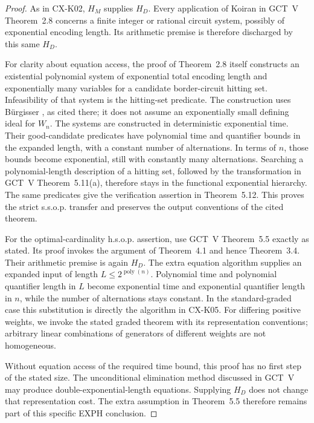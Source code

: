 \documentclass[11pt,a4paper]{article}
\begin{document}
\begin{proof}
As in CX-K02, $H_M$ supplies $H_D$. Every application of Koiran in
GCT~V Theorem~2.8 concerns a finite integer or rational circuit system,
possibly of exponential encoding length. Its arithmetic premise is
therefore discharged by this same $H_D$.

For clarity about equation access, the proof of Theorem~2.8 itself
constructs an existential polynomial system of exponential total
encoding length and exponentially many variables for a candidate
border-circuit hitting set. Infeasibility of that system is the
hitting-set predicate. The construction uses
B\"urgisser \cite[Theorem~5.7]{Burgisser04}, as cited there; it does
not assume an exponentially small defining ideal for $W_n$.
The systems are constructed in deterministic exponential time.
Their good-candidate predicates have polynomial time and quantifier
bounds in the expanded length, with a constant number of
alternations. In terms of $n$, those bounds become exponential,
still with constantly many alternations. Searching a polynomial-length
description of a hitting set, followed by the transformation in
GCT~V Theorem~5.11(a), therefore stays in the functional exponential
hierarchy. The same predicates give the verification assertion in
Theorem~5.12. This proves the strict s.s.o.p. transfer and preserves
the output conventions of the cited theorem.

For the optimal-cardinality h.s.o.p. assertion, use GCT~V
Theorem~5.5 exactly as stated. Its proof invokes the argument of
Theorem~4.1 and hence Theorem~3.4. Their arithmetic premise is again
$H_D$. The extra equation algorithm supplies an expanded input of
length $L\le 2^{\operatorname{poly}(n)}$. Polynomial time and
polynomial quantifier length in $L$ become exponential time and
exponential quantifier length in $n$, while the number of alternations
stays constant. In the standard-graded case this substitution is
directly the algorithm in CX-K05. For differing positive weights,
we invoke the stated graded theorem with its representation
conventions; arbitrary linear combinations of generators of different
weights are not homogeneous.

Without equation access of the required time bound, this proof has
no first step of the stated size. The unconditional elimination
method discussed in GCT~V may produce double-exponential-length
equations. Supplying $H_D$ does not change that representation cost.
The extra assumption in Theorem~5.5 therefore remains part of this
specific EXPH conclusion.
\end{proof}
\end{document}
